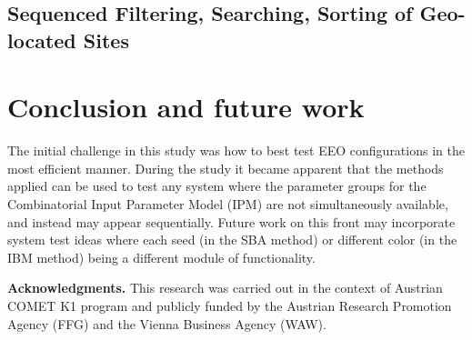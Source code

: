 \documentclass[conference]{IEEEtran}
\begin{document}
	\subsection{Sequenced Filtering, Searching, Sorting of Geo-located Sites}
	
\section{Conclusion and future work}
	
The initial challenge in this study was how to best test EEO configurations in the most efficient manner.
During the study it became apparent that the methods applied can be used to test any system where the parameter groups for
the Combinatorial Input Parameter Model (IPM) are not simultaneously available, and instead may appear sequentially.
Future work on this front may incorporate system test ideas where each seed (in the SBA method) or different color (in the IBM method) being a different module of functionality.

\textbf{Acknowledgments.}
This research was carried out in the context of Austrian COMET K1
program and publicly funded by the Austrian Research Promotion Agency
(FFG) and the Vienna Business Agency (WAW).



\end{document}
